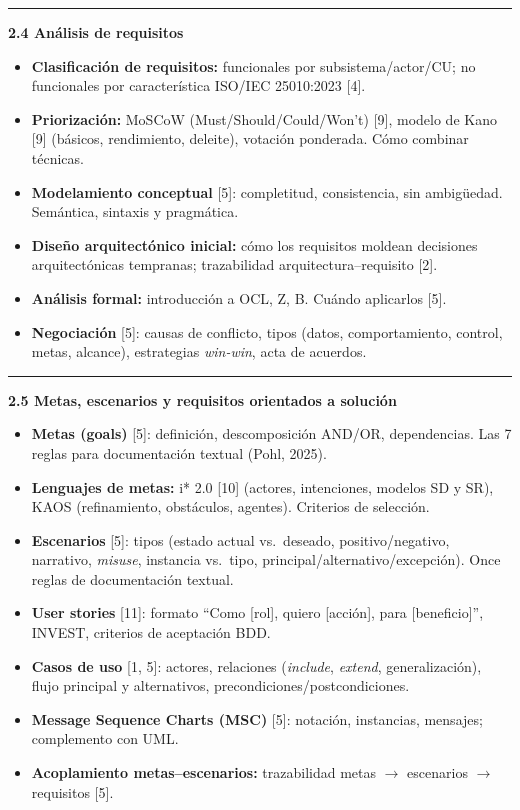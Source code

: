 \documentclass[11pt,a4paper]{article}
\newcommand{\submark}[1]{\par\vspace{4pt}\noindent
  {\color{secblue}\rule[-1pt]{3.5pt}{12pt}}\hspace{6pt}\textbf{\color{secdark}#1}\par\vspace{2pt}}
\begin{document}
\submark{2.4 Análisis de requisitos}
\begin{itemize}
\item \textbf{Clasificación de requisitos:} funcionales por subsistema/actor/CU; no funcionales por característica ISO/IEC 25010:2023 [4].
\item \textbf{Priorización:} MoSCoW (Must/Should/Could/Won't) [9], modelo de Kano [9] (básicos, rendimiento, deleite), votación ponderada. Cómo combinar técnicas.
\item \textbf{Modelamiento conceptual} [5]: completitud, consistencia, sin ambigüedad. Semántica, sintaxis y pragmática.
\item \textbf{Diseño arquitectónico inicial:} cómo los requisitos moldean decisiones arquitectónicas tempranas; trazabilidad arquitectura–requisito [2].
\item \textbf{Análisis formal:} introducción a OCL, Z, B. Cuándo aplicarlos [5].
\item \textbf{Negociación} [5]: causas de conflicto, tipos (datos, comportamiento, control, metas, alcance), estrategias \textit{win-win}, acta de acuerdos.
\end{itemize}

\submark{2.5 Metas, escenarios y requisitos orientados a solución}
\begin{itemize}
\item \textbf{Metas (goals)} [5]: definición, descomposición AND/OR, dependencias. Las 7 reglas para documentación textual (Pohl, 2025).
\item \textbf{Lenguajes de metas:} i* 2.0 [10] (actores, intenciones, modelos SD y SR), KAOS (refinamiento, obstáculos, agentes). Criterios de selección.
\item \textbf{Escenarios} [5]: tipos (estado actual vs.\ deseado, positivo/negativo, narrativo, \textit{misuse}, instancia vs.\ tipo, principal/alternativo/excepción). Once reglas de documentación textual.
\item \textbf{User stories} [11]: formato ``Como [rol], quiero [acción], para [beneficio]'', INVEST, criterios de aceptación BDD.
\item \textbf{Casos de uso} [1, 5]: actores, relaciones (\textit{include}, \textit{extend}, generalización), flujo principal y alternativos, precondiciones/postcondiciones.
\item \textbf{Message Sequence Charts (MSC)} [5]: notación, instancias, mensajes; complemento con UML.
\item \textbf{Acoplamiento metas–escenarios:} trazabilidad metas $\rightarrow$ escenarios $\rightarrow$ requisitos [5].
\end{itemize}
\end{document}
